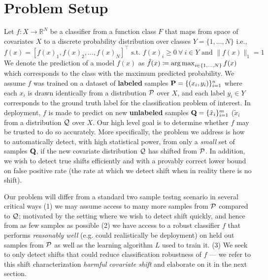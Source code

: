 \section{Problem Setup}\label{sec:problem-setup}
Let $f: X\to \mathbb{R}^N $ be a classifier from a function class $F$ that maps from space of covariates $X$ to a discrete probability distribution over classes $Y=\{1,\ldots,N\}$ i.e.,
\[f(x)=[f(x)_1, f(x)_2, \ldots, f(x)_N]^\top\text{ s.t. }f(x)_i \geq 0\ \forall\ i\in Y \text{ and } \|f(x)\|_1 = 1\]
We denote the prediction of a model $f(x)$ as $\hat{f}(x)\coloneq \operatorname*{arg\,max}_{i\in \{1,\dots,N\} }f(x)$ which corresponds to the class with the maximum predicted probability.
We assume $f$ was trained on a dataset of \textbf{labeled} samples $\mathbf{P} = \{(x_i,y_i)\}_{i=1}^n$ where each $x_i$ is drawn identically from a distribution $\mathcal{P}$ over $X$, and
each label $y_i \in Y$ corresponds to the ground truth label for the classification problem of interest.
In deployment, $f$ is made to predict on new \textbf{unlabeled} samples $\mathbf{Q} = \{\tilde{x}_i\}_{i=1}^m$ ($\tilde{x}_i$ from a distribution $\mathcal{Q}$ over $X$.
Our high level goal is to determine whether $f$ may be trusted to do so accurately.
More specifically, the problem we address is how to automatically detect, with high statistical power, from only a \textit{small} set of samples $\mathbf{Q}$,
if the new covariate distribution $\mathcal{Q}$ has shifted from $\mathcal{P}$.
In addition, we wish to detect true shifts efficiently and with a provably correct lower bound on false positive rate (the rate at which we detect shift when in reality there is no shift).

Our problem will differ from a standard two sample testng scenario in several critical ways (1) we may assume access to many more samples from $\mathcal{P}$
compared to $\mathcal{Q}$; motivated by the setting where we wish to detect shift quickly, and hence from as few samples as possible
(2) we have access to a robust classifier $f$ that performs \textit{reasonably well} (e.g. could realistically be deployment) on held out samples from $\mathcal{P}$ as well as the learning algorithm $L$ used to train it.
(3) We seek to only detect shifts that could reduce classification robustness of $f$ --- we refer to this shift characterization \textit{harmful covariate shift} and elaborate on it in the next section.


